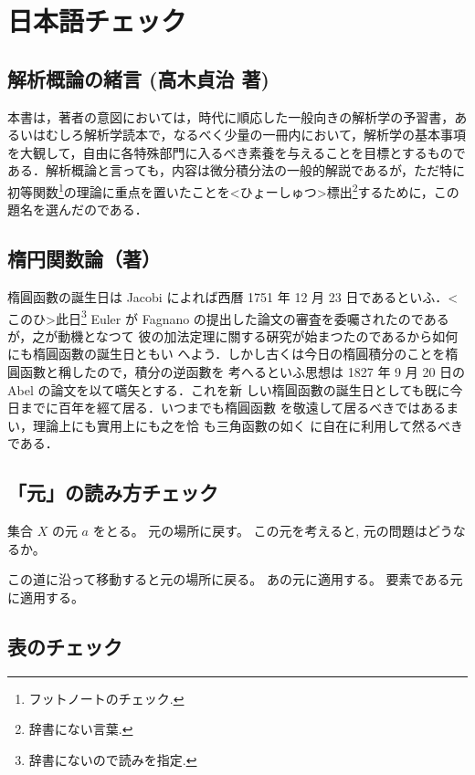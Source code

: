 \documentclass[lualatex,ja=standard,jafont=haranoaji]{bxjsarticle}
\newcommand\?{\BrailleReading}
\numberwithin{subsection}{section}
\numberwithin{equation}{subsection}
\begin{document}
\section{日本語チェック}

\subsection{解析概論の緒言 (高木貞治 著)}
本書は，著者の意図においては，時代に順応した一般向きの解析学の予習書，あるいはむしろ解析学読本で，なるべく少量の一冊内において，解析学の基本事項を大観して，自由に各特殊部門に入るべき素養を与えることを目標とするものである．解析概論と言っても，内容は微分積分法の一般的解説であるが，ただ特に初等関数\footnote{フットノートのチェック.}の理論に重点を置いたことを\?<ひょーしゅつ>{標出}\footnote{辞書にない言葉.}するために，この題名を選んだのである．

\subsection{楕円関数論（\?{竹内}\?{端三}著）}
楕圓函數の誕生日は Jacobi によれば西曆 1751 年 12 月 23 日であるといふ．\?<このひ>{此日}\footnote{辞書にないので読みを指定.}
Euler が Fagnano の提出した論文の審査を委囑されたのであるが，之が動機となつて
彼の加法定理に關する硏究が始まつたのであるから如何にも楕圓函數の誕生日ともい
へよう．しかし古くは今日の楕圓積分のことを楕圓函數と稱したので，積分の逆函數を
考へるといふ思想は 1827 年 9 月 20 日の Abel の論文を以て嚆矢とする．これを新%
しい楕圓函數の誕生日としても旣に今日までに百年を經て居る．いつまでも楕圓函數
を敬遠して居るべきではあるまい，理論上にも實用上にも之を恰%
も三角函數の如く
に自在に利用して然るべきである．



\subsection{「元」の読み方チェック}%

集合 $X$ の元 $a$ をとる。
元の場所に戻す。
この元を考えると, 元の問題はどうなるか。

この道に沿って移動すると元の場所に戻る。
あの元に適用する。
要素である元に適用する。


\subsection{表のチェック}
\end{document}
